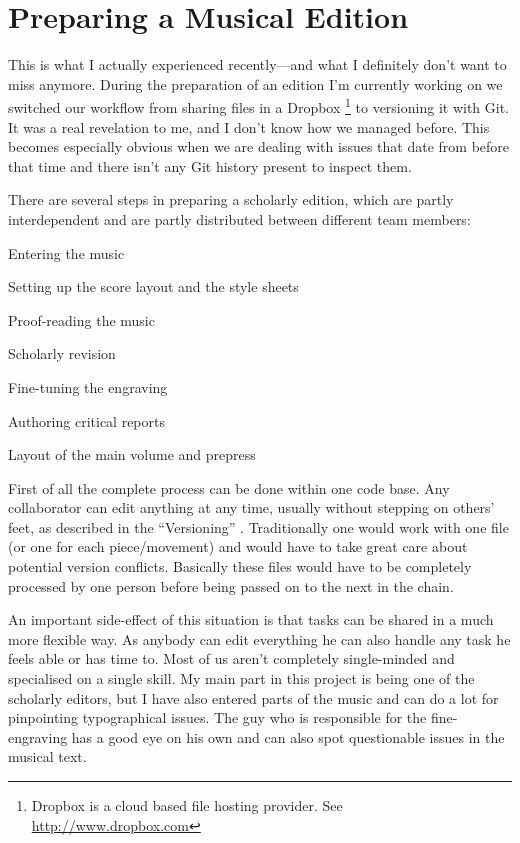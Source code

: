 \documentclass[DIV=12]{scrreprt}
\begin{document}
\section{Preparing a Musical Edition}
\label{sec:pt_preparing-edition}
This is what I actually experienced recently---and what I definitely don't want to miss anymore.
During the preparation of an edition I'm currently working on we switched our workflow from sharing files in a Dropbox%
\footnote{Dropbox is a cloud based file hosting provider. See \url{http://www.dropbox.com}}
to versioning it with Git.
It was a real revelation to me, and I don't know how we managed before.
This becomes especially obvious when we are dealing with issues that date from before that time and there isn't any Git history present to inspect them.

There are several steps in preparing a scholarly edition, which are partly interdependent and are partly distributed between different team members:
\begin{itemize*}
    \item Entering the music
    \item Setting up the score layout and the style sheets
    \item Proof-reading the music
    \item Scholarly revision
    \item Fine-tuning the engraving
    \item Authoring critical reports
    \item Layout of the main volume and prepress
\end{itemize*}

First of all the complete process can be done within one code base.
Any collaborator can edit anything at any time, usually without stepping on others' feet, as described in the “Versioning” .
Traditionally one would work with one file (or one for each piece/movement) and would have to take great care about potential version conflicts.
Basically these files would have to be completely processed by one person before being passed on to the next in the chain.

An important side-effect of this situation is that tasks can be shared in a much more flexible way.
As anybody can edit everything he can also handle any task he feels able or has time to.
Most of us aren't completely single-minded and specialised on a single skill.
My main part in this project is being one of the scholarly editors, but I have also entered parts of the music and can do a lot for pinpointing typographical issues.
The guy who is responsible for the fine-engraving has a good eye on his own and can also spot questionable issues in the musical text.
\end{document}
